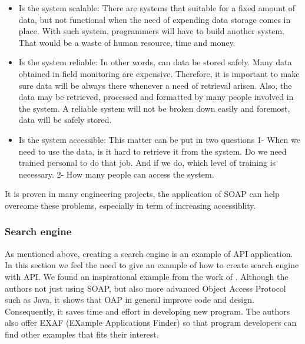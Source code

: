 	\begin{itemize}
		\item Is the system scalable: 
		There are systems that suitable for a fixed amount of data, but not functional when the need of expending data storage comes in place. 
		With such system, programmers will have to build another system. 
		That would be a waste of human resource, time and money.
		\item Is the system reliable: 
		In other words, can data be stored safely. 
		Many data obtained in field monitoring are expensive. 
		Therefore, it is important to make sure data will be always there whenever a need of retrieval arisen. 
		Also, the data may be retrieved, processed and formatted by many people involved in the system.
		A reliable system will not be broken down easily and foremost, data will be safely stored.
		\item Is the system accessible: 
		This matter can be put in two questions 1- When we need to use the data, is it hard to retrieve it from the system. 
		Do we need trained personal to do that job.
		And if we do, which level of training is necessary. 
		2- How many people can access the system. 
		
	\end{itemize}
	It is proven in many engineering projects, the application of SOAP can help overcome these problems, especially in term of increasing accessiblity.
	\subsubsection{Search engine}
	As mentioned above, creating a search engine is an example of API application. 
	In this section we feel the need to give an example of how to create search engine with API. 
	We found an inspirational example from the work of \cite{Noei2016135}. 
	Although the authors not just using SOAP, but also more advanced Object Access Protocol such as Java, it shows that OAP in general improve code and design. 
	Consequently, it saves time and effort in developing new program.
	The authors also offer EXAF (EXample Applications Finder) so that program developers can find other examples that fits their interest.
	
\newpage %